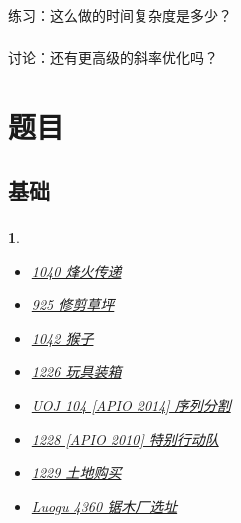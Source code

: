 \documentclass[9pt, UTF8]{beamer} %
\newcommand \fts {\frametitle{\insertsubsection}}
\newtheorem*{bbox}{}
\begin{document}
	\begin{frame}
		\fts

		练习：这么做的时间复杂度是多少？
	\end{frame}

	\begin{frame}
		\fts

		讨论：还有更高级的斜率优化吗？
	\end{frame}

	\section{题目}

	\subsection{基础}

	\begin{frame}
		\fts

		\begin{bbox}
			\begin{itemize}

				\item \href {http://219.153.61.2:9000/problem/1040} {1040 烽火传递}

				\item \href {http://219.153.61.2:9000/problem/925} {925 修剪草坪}

				\item \href {http://219.153.61.2:9000/problem/1042} {1042 猴子}

				\item \href {http://219.153.61.2:9000/problem/1226} {1226 玩具装箱}

				\item \href {http://uoj.ac/problem/104} {UOJ 104 [APIO 2014] 序列分割}

				\item \href {http://219.153.61.2:9000/problem/1228} {1228 [APIO 2010] 特别行动队}

				\item \href {http://219.153.61.2:9000/problem/1229} {1229 土地购买}

				\item \href {https://www.luogu.org/problemnew/show/P4360} {Luogu 4360 锯木厂选址}

			\end{itemize}
		\end{bbox}

	\end{frame}
\end{document}
